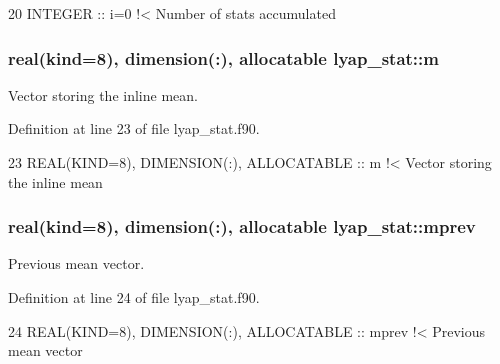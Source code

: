 \begin{DoxyCode}
20   \textcolor{keywordtype}{INTEGER} :: i=0\textcolor{comment}{ !< Number of stats accumulated}
\end{DoxyCode}
\subsubsection[{\texorpdfstring{m}{m}}]{\setlength{\rightskip}{0pt plus 5cm}real(kind=8), dimension(\+:), allocatable lyap\+\_\+stat\+::m\hspace{0.3cm}{\ttfamily [private]}}\hypertarget{namespacelyap__stat_a99687dc4df185df56e841e0d87d1faae}{}\label{namespacelyap__stat_a99687dc4df185df56e841e0d87d1faae}


Vector storing the inline mean. 



Definition at line 23 of file lyap\+\_\+stat.\+f90.


\begin{DoxyCode}
23   \textcolor{keywordtype}{REAL(KIND=8)}, \textcolor{keywordtype}{DIMENSION(:)}, \textcolor{keywordtype}{ALLOCATABLE} :: m\textcolor{comment}{       !< Vector storing the inline mean}
\end{DoxyCode}
\subsubsection[{\texorpdfstring{mprev}{mprev}}]{\setlength{\rightskip}{0pt plus 5cm}real(kind=8), dimension(\+:), allocatable lyap\+\_\+stat\+::mprev\hspace{0.3cm}{\ttfamily [private]}}\hypertarget{namespacelyap__stat_ad4c65ab53e8f6e8d6a967fd7bc0caa60}{}\label{namespacelyap__stat_ad4c65ab53e8f6e8d6a967fd7bc0caa60}


Previous mean vector. 



Definition at line 24 of file lyap\+\_\+stat.\+f90.


\begin{DoxyCode}
24   \textcolor{keywordtype}{REAL(KIND=8)}, \textcolor{keywordtype}{DIMENSION(:)}, \textcolor{keywordtype}{ALLOCATABLE} :: mprev\textcolor{comment}{   !< Previous mean vector}
\end{DoxyCode}
